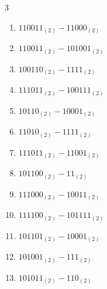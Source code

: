 \begin{multicols}{3}
\begin{enumerate}

  \item $110011_{(2)} - 11000_{(2)}$


  \item $110011_{(2)} - 101001_{(2)}$


  \item $100110_{(2)} - 1111_{(2)}$


  \item $111011_{(2)} - 100111_{(2)}$


  \item $10110_{(2)} - 10001_{(2)}$


  \item $11010_{(2)} - 1111_{(2)}$


  \item $111011_{(2)} - 11001_{(2)}$


  \item $101100_{(2)} - 11_{(2)}$


\columnbreak %

  \item $111000_{(2)} - 10011_{(2)}$


  \item $111100_{(2)} - 101111_{(2)}$


  \item $101101_{(2)} - 10001_{(2)}$


  \item $101001_{(2)} - 111_{(2)}$


  \item $101011_{(2)} - 110_{(2)}$



\end{enumerate}
\end{multicols}
